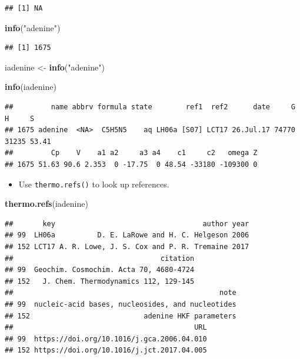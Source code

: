 \documentclass[]{tufte-book}
\newenvironment{Shaded}{}{}
\newcommand{\KeywordTok}[1]{\textcolor[rgb]{0.00,0.44,0.13}{\textbf{#1}}}
\newcommand{\StringTok}[1]{\textcolor[rgb]{0.25,0.44,0.63}{#1}}
\newcommand{\NormalTok}[1]{#1}
\providecommand{\tightlist}{%
  \setlength{\itemsep}{0pt}\setlength{\parskip}{0pt}}
\begin{document}
\begin{verbatim}
## [1] NA
\end{verbatim}

\begin{Shaded}
\begin{Highlighting}[]
\KeywordTok{info}\NormalTok{(}\StringTok{"adenine"}\NormalTok{)}
\end{Highlighting}
\end{Shaded}

\begin{verbatim}
## [1] 1675
\end{verbatim}

\begin{Shaded}
\begin{Highlighting}[]
\NormalTok{iadenine <-}\StringTok{ }\KeywordTok{info}\NormalTok{(}\StringTok{"adenine"}\NormalTok{)}
\end{Highlighting}
\end{Shaded}

\begin{Shaded}
\begin{Highlighting}[]
\KeywordTok{info}\NormalTok{(iadenine)}
\end{Highlighting}
\end{Shaded}

\begin{verbatim}
##         name abbrv formula state        ref1  ref2      date     G     H     S
## 1675 adenine  <NA>  C5H5N5    aq LH06a [S07] LCT17 26.Jul.17 74770 31235 53.41
##         Cp    V    a1 a2     a3 a4    c1     c2   omega Z
## 1675 51.63 90.6 2.353  0 -17.75  0 48.54 -33180 -109300 0
\end{verbatim}

\begin{itemize}
\tightlist
\item
  Use {\texttt{thermo.refs()}} to look up references.
\end{itemize}

\begin{Shaded}
\begin{Highlighting}[]
\KeywordTok{thermo.refs}\NormalTok{(iadenine)}
\end{Highlighting}
\end{Shaded}

\begin{verbatim}
##       key                                   author year
## 99  LH06a          D. E. LaRowe and H. C. Helgeson 2006
## 152 LCT17 A. R. Lowe, J. S. Cox and P. R. Tremaine 2017
##                                   citation
## 99  Geochim. Cosmochim. Acta 70, 4680-4724
## 152   J. Chem. Thermodynamics 112, 129-145
##                                                 note
## 99  nucleic-acid bases, nucleosides, and nucleotides
## 152                           adenine HKF parameters
##                                           URL
## 99  https://doi.org/10.1016/j.gca.2006.04.010
## 152 https://doi.org/10.1016/j.jct.2017.04.005
\end{verbatim}
\end{document}
